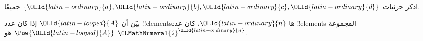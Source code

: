 \documentclass[../../../include/open-logic-section]{subfiles}
\begin{document}
\begin{prob}
اذكر جزئيات $\{\OLId{latin-ordinary}{a}, \OLId{latin-ordinary}{b}, \OLId{latin-ordinary}{c}, \OLId{latin-ordinary}{d}\}$ جميعًا.
\end{prob}

\begin{prob}
بيّن أن $\OLId{latin-looped}{A}$ إذا كان عدد !!{element}sها $\OLId{latin-ordinary}{n}$، كان عدد !!{element}s
المجموعة $\Pow{\OLId{latin-looped}{A}}$ هو $\OLMathNumeral{2}^\OLId{latin-ordinary}{n}$.
\end{prob}
\end{document}
